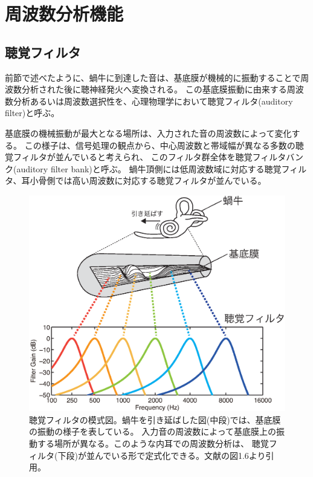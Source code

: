 \section{周波数分析機能}

\subsection{聴覚フィルタ}
前節で述べたように、蝸牛に到達した音は、基底膜が機械的に振動することで周波数分析された後に聴神経発火へ変換される。
この基底膜振動に由来する周波数分析あるいは周波数選択性を、心理物理学において聴覚フィルタ(auditory filter)と呼ぶ。

基底膜の機械振動が最大となる場所は、入力された音の周波数によって変化する。
この様子は、信号処理の観点から、中心周波数と帯域幅が異なる多数の聴覚フィルタが並んでいると考えられ、
このフィルタ群全体を聴覚フィルタバンク(auditory filter bank)と呼ぶ。
蝸牛頂側には低周波数域に対応する聴覚フィルタ、耳小骨側では高い周波数に対応する聴覚フィルタが並んでいる。

\begin{figure}[h]
  \vspace{20pt}
  \centering
  \includegraphics[width=0.6\hsize]{Figure/RelatedResearch/KiteimakuAudFilter.eps}
  \caption{聴覚フィルタの模式図。蝸牛を引き延ばした図(中段)では、基底膜の振動の様子を表している。
            入力音の周波数によって基底膜上の振動する場所が異なる。このような内耳での周波数分析は、
            聴覚フィルタ(下段)が並んでいる形で定式化できる。文献\cite{higashiyama2020WHIS}の図1.6より引用。}
  \label{fig:BasilarMembrane}
\end{figure}


